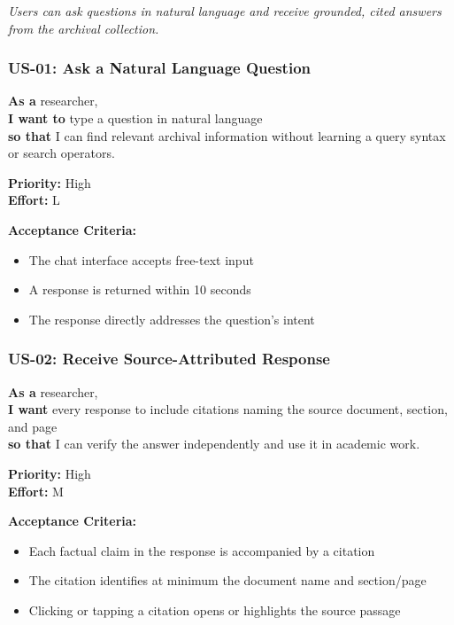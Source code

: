 \documentclass[
  11pt,
]{article}
\providecommand{\tightlist}{%
  \setlength{\itemsep}{0pt}\setlength{\parskip}{0pt}}
\begin{document}
\emph{Users can ask questions in natural language and receive grounded,
cited answers from the archival collection.}

\subsubsection{US-01: Ask a Natural Language
Question}\label{us-01-ask-a-natural-language-question}

\textbf{As a} researcher,\\
\textbf{I want to} type a question in natural language\\
\textbf{so that} I can find relevant archival information without
learning a query syntax or search operators.

\textbf{Priority:} High\\
\textbf{Effort:} L

\textbf{Acceptance Criteria:}

\begin{itemize}
\tightlist
\item
  The chat interface accepts free-text input
\item
  A response is returned within 10 seconds
\item
  The response directly addresses the question's intent
\end{itemize}

\subsubsection{US-02: Receive Source-Attributed
Response}\label{us-02-receive-source-attributed-response}

\textbf{As a} researcher,\\
\textbf{I want} every response to include citations naming the source
document, section, and page\\
\textbf{so that} I can verify the answer independently and use it in
academic work.

\textbf{Priority:} High\\
\textbf{Effort:} M

\textbf{Acceptance Criteria:}

\begin{itemize}
\tightlist
\item
  Each factual claim in the response is accompanied by a citation
\item
  The citation identifies at minimum the document name and section/page
\item
  Clicking or tapping a citation opens or highlights the source passage
\end{itemize}
\end{document}
